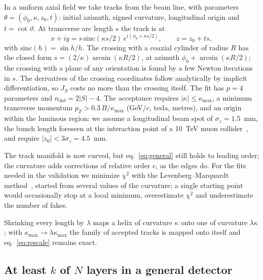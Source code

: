 \IfFileExists{jinst.cls}{\documentclass[a4paper,11pt]{jinst}}
\newcommand{\ndof}{n_\mathrm{dof}}
\begin{document}
In a uniform axial field we take tracks from the beam line, with parameters
$\theta=(\phi_0,\kappa,z_0,t)$: initial azimuth, signed curvature, longitudinal origin and
$t=\cot\vartheta$. At transverse arc length $s$ the track is at
\begin{equation}
  x+iy = s\,\mathrm{sinc}(\kappa s/2)\,e^{i(\phi_0+\kappa s/2)},\qquad z=z_0+ts ,
\end{equation}
with $\mathrm{sinc}(h)=\sin h/h$. The crossing with a coaxial cylinder of radius $R$ has the
closed form $s=(2/\kappa)\arcsin(\kappa R/2)$, at azimuth $\phi_0+\arcsin(\kappa R/2)$; the
crossing with a plane of any orientation is found by a few Newton iterations in $s$. The
derivatives of the crossing coordinates follow analytically by implicit differentiation, so
$J_S$ costs no more than the crossing itself. The fit has $p=4$ parameters and
$\ndof=2|S|-4$. The acceptance requires $|\kappa|\le\kappa_\mathrm{max}$, a minimum transverse
momentum $p_T>0.3\,B/\kappa_\mathrm{max}$ (GeV/$c$, tesla, metres), and an origin within the
luminous region: we assume a longitudinal beam spot of $\sigma_z=1.5$~mm, the bunch length foreseen
at the interaction point of a 10~TeV muon collider~\cite{IMCC:2024interim}, and require
$|z_0|<3\sigma_z=4.5$~mm.

The track manifold is now curved, but eq.~\eqref{eq:general} still holds to leading order; the
curvature adds corrections of relative order $c$, as the edges do. For the fits needed in the
validation we minimize $\chi^2$ with the Levenberg--Marquardt
method~\cite{Levenberg:1944,Marquardt:1963}, started from several values of the curvature; a
single starting point would occasionally stop at a local minimum, overestimate $\chi^2$ and
underestimate the number of fakes.

Shrinking every length by $\lambda$ maps a helix of curvature $\kappa$ onto one of curvature
$\lambda\kappa$; with $\kappa_\mathrm{max}\to\lambda\kappa_\mathrm{max}$ the family of accepted
tracks is mapped onto itself and eq.~\eqref{eq:rescale} remains exact.

\subsection{At least $k$ of $N$ layers in a general detector}\label{sec:kofn-general}
\end{document}
